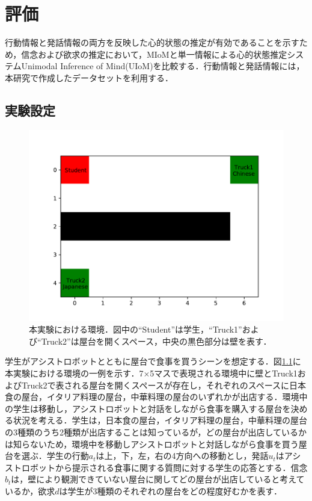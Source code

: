 \chapter{評価}
\par
行動情報と発話情報の両方を反映した心的状態の推定が有効であることを示すため，信念および欲求の推定において，MIoMと単一情報による心的状態推定システムUnimodal Inference of Mind(UIoM)を比較する．行動情報と発話情報には，本研究で作成したデータセットを利用する．

\section{実験設定}

\begin{figure}[htbp]
  \begin{center}
    \includegraphics[]{./figure.pdf}
    \caption{本実験における環境．図中の``Student''は学生，``Truck1''および``Truck2''は屋台を開くスペース，中央の黒色部分は壁を表す．}
    \label{fig:ex_env}
  \end{center}
\end{figure}

\par
学生がアシストロボットとともに屋台で食事を買うシーンを想定する．図\ref{fig:ex_env}に本実験における環境の一例を示す．7$\times$5マスで表現される環境中に壁とTruck1およびTruck2で表される屋台を開くスペースが存在し，それぞれのスペースに日本食の屋台，イタリア料理の屋台，中華料理の屋台のいずれかが出店する．環境中の学生は移動し，アシストロボットと対話をしながら食事を購入する屋台を決める状況を考える．学生は，日本食の屋台，イタリア料理の屋台，中華料理の屋台の3種類のうち2種類が出店することは知っているが，どの屋台が出店しているかは知らないため，環境中を移動しアシストロボットと対話しながら食事を買う屋台を選ぶ．学生の行動$a_t$は上，下，左，右の4方向への移動とし，発話$u_t$はアシストロボットから提示される食事に関する質問に対する学生の応答とする．信念$b_t$は，壁により観測できていない屋台に関してどの屋台が出店していると考えているか，欲求$d$は学生が3種類のそれぞれの屋台をどの程度好むかを表す．



